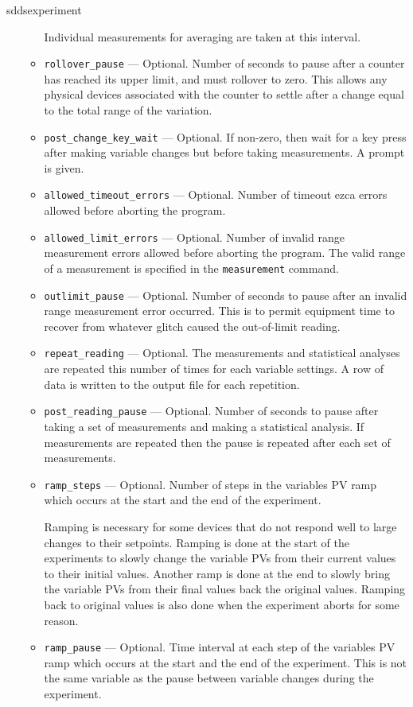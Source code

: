 \begin{sddsprog}{sddsexperiment}
\begin{itemize}
\begin{itemize}
                Individual measurements for averaging are taken at this interval.
    \item {\verb+rollover_pause+} ---  Optional. Number of seconds to pause after a counter has reached
                its upper limit, and must rollover to zero. This allows any physical devices
                associated with the counter to settle after a change equal to the total range
                of the variation.
    \item {\verb+post_change_key_wait+} ---  Optional. If non-zero, then wait for a key press after
                making variable changes but before taking measurements. A prompt is given.
    \item {\verb+allowed_timeout_errors+} ---  Optional. Number of timeout ezca errors allowed before aborting the
                program.
    \item {\verb+allowed_limit_errors+} ---  Optional. Number of invalid range measurement errors
                allowed before aborting the
                program. The valid range of a measurement is specified in the {\verb+measurement+} command.
    \item {\verb+outlimit_pause+} ---  Optional. Number of seconds to pause after an invalid range measurement error
                occurred. This is to permit equipment time to recover from whatever glitch caused the out-of-limit
                reading.
    \item {\verb+repeat_reading+} --- Optional. The measurements and statistical analyses are repeated this number of
                times for each variable settings. A row of data is written to the output file
                for each repetition.
    \item {\verb+post_reading_pause+} --- Optional. Number of seconds to pause after taking a
                set of measurements and making a statistical analysis.
                If measurements are repeated then the pause is repeated after each set of measurements.
    \item {\verb+ramp_steps+} --- Optional. Number of steps in the variables PV ramp
                which occurs at the start and the end of the experiment.

                Ramping is necessary for some devices that do not respond well
                to large changes to their setpoints. Ramping is done
                at the start of the experiments to slowly change the variable PVs from their
                current values to their initial values. Another ramp is
                done at the end to slowly bring the variable PVs from their final values
                back the original values. Ramping back to original values
                is also done when the experiment aborts for some reason.
    \item {\verb+ramp_pause+} --- Optional. Time interval at each step of the variables PV ramp
                which occurs at the start and the end of the experiment. This is not the same variable
                as the pause between variable changes during the experiment.
  \end{itemize}


\end{itemize}
\end{sddsprog}
